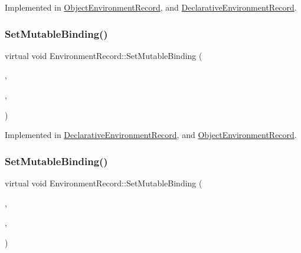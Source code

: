 Implemented in \hyperlink{struct_object_environment_record_a4c620b161bb8939304bb688bfa2e5d3b}{Object\+Environment\+Record}, and \hyperlink{struct_declarative_environment_record_aafb5da7123366dd48562e07fd393af2d}{Declarative\+Environment\+Record}.

\mbox{\label{struct_environment_record_a9d5250a9cc6fa4d1f9ecbf5213b6cb24}} 
\subsubsection{\texorpdfstring{Set\+Mutable\+Binding()}{SetMutableBinding()}\hspace{0.1cm}{\footnotesize\ttfamily [1/2]}}
{\footnotesize\ttfamily virtual void Environment\+Record\+::\+Set\+Mutable\+Binding (\begin{DoxyParamCaption}\item[{const \textbf{ std\+::string} \&}]{,  }\item[{const \hyperlink{class_type}{Type} \&}]{,  }\item[{bool}]{ }\end{DoxyParamCaption})\hspace{0.3cm}{\ttfamily [pure virtual]}}



Implemented in \hyperlink{struct_declarative_environment_record_a9e0b7b5b57e3125b4288a30e2ceac63c}{Declarative\+Environment\+Record}, and \hyperlink{struct_object_environment_record_acbc8e93de3f48c41c0413957974642b0}{Object\+Environment\+Record}.

\mbox{\label{struct_environment_record_ae5268e78f690c5f9eb50d8abe2342fff}} 
\subsubsection{\texorpdfstring{Set\+Mutable\+Binding()}{SetMutableBinding()}\hspace{0.1cm}{\footnotesize\ttfamily [2/2]}}
{\footnotesize\ttfamily virtual void Environment\+Record\+::\+Set\+Mutable\+Binding (\begin{DoxyParamCaption}\item[{\hyperlink{struct_environment_record_ab67bd5dbacae338473147ec3f753a364}{String\+Ref}}]{,  }\item[{const \hyperlink{class_type}{Type} \&}]{,  }\item[{const \hyperlink{struct_boolean}{Boolean} \&}]{ }\end{DoxyParamCaption})\hspace{0.3cm}{\ttfamily [pure virtual]}}



